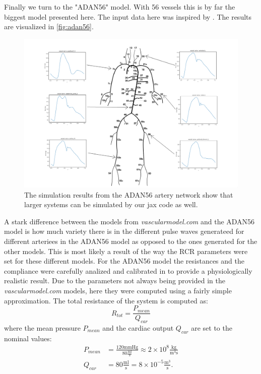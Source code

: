 \documentclass[a4paper, oneside]{discothesis}
\begin{document}
Finally we turn to the "ADAN56" model.
With 56 vessels this is by far the biggest model presented here.
The input data here was inspired by \cite{murgo1980aortic}.
The results are visualized in \autoref{fig:adan56}.
\begin{figure} [!ht]
	\centering
	\includegraphics[width=0.8\columnwidth]{figures/adan56_annotated.png}
	\caption{The simulation results from the ADAN56 artery network show that larger systems can be simulated by our jax code as well.}
	\label{fig:adan56}
\end{figure}
A stark difference between the models from \emph{vascularmodel.com} and the ADAN56 model is how much variety there is in the different pulse waves generateed for different arteriees in the ADAN56 model as opposed to the ones generated for the other models.
This is most likely a result of the way the RCR parameters were set for these different models.
For the ADAN56 model the resistances and the compliance were carefully analized and calibrated in \cite{blanco2014anatomically,blanco2014blood} to provide a physiologically realistic result.
Due to the parameters not always being provided in the \emph{vascularmodel.com} models, here they were computed using a fairly simple approximation.
The total resistance of the system is computed as:
\begin{equation}
R_{tot} = \frac{P_{mean}}{Q_{car}}
\end{equation}
where the mean pressure $P_{mean}$ and the cardiac output $Q_{car}$ are set to the nominal values:
\begin{align}
	P_{mean} &= \frac{120 \text{mmHg}}{80 \frac{\text{ml}}{\text{s}}} \approx 2 \times 10^8 \frac{\text{kg}}{\text{m}^4\text{s}} \\
	Q_{car} &= 80 \frac{\text{ml}}{\text{s}} = 8 \times 10^{-5} \frac{\text{m}^3}{\text{s}}. \\
\end{align}
\end{document}
